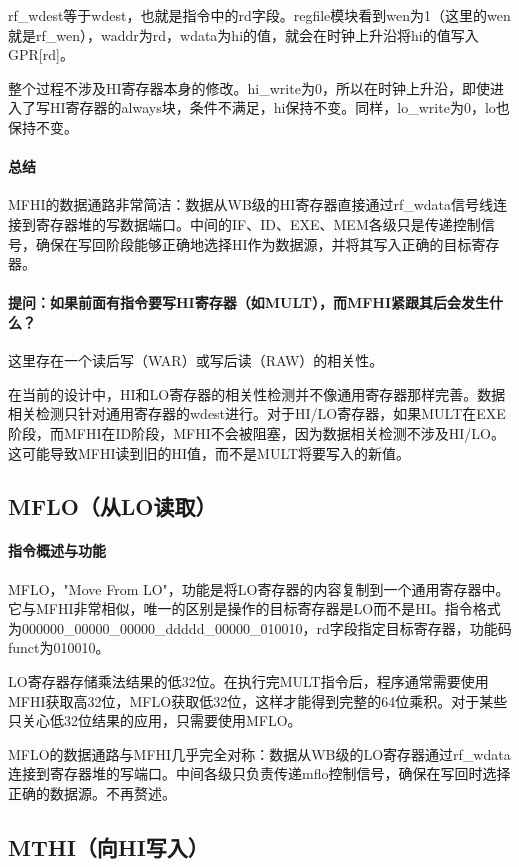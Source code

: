 \documentclass[a4paper]{article}
\begin{document}
	rf\_wdest等于wdest，也就是指令中的rd字段。regfile模块看到wen为1（这里的wen就是rf\_wen），waddr为rd，wdata为hi的值，就会在时钟上升沿将hi的值写入GPR[rd]。
	
	整个过程不涉及HI寄存器本身的修改。hi\_write为0，所以在时钟上升沿，即使进入了写HI寄存器的always块，条件不满足，hi保持不变。同样，lo\_write为0，lo也保持不变。
	\paragraph{总结}
	MFHI的数据通路非常简洁：数据从WB级的HI寄存器直接通过rf\_wdata信号线连接到寄存器堆的写数据端口。中间的IF、ID、EXE、MEM各级只是传递控制信号，确保在写回阶段能够正确地选择HI作为数据源，并将其写入正确的目标寄存器。
	\paragraph{提问：如果前面有指令要写HI寄存器（如MULT），而MFHI紧跟其后会发生什么？}
	这里存在一个读后写（WAR）或写后读（RAW）的相关性。
	
	在当前的设计中，HI和LO寄存器的相关性检测并不像通用寄存器那样完善。数据相关检测只针对通用寄存器的wdest进行。对于HI/LO寄存器，如果MULT在EXE阶段，而MFHI在ID阶段，MFHI不会被阻塞，因为数据相关检测不涉及HI/LO。这可能导致MFHI读到旧的HI值，而不是MULT将要写入的新值。
	
	\subsection{MFLO（从LO读取）}
	\paragraph{指令概述与功能}
	MFLO，"Move From LO"，功能是将LO寄存器的内容复制到一个通用寄存器中。它与MFHI非常相似，唯一的区别是操作的目标寄存器是LO而不是HI。指令格式为000000\_00000\_00000\_ddddd\_00000\_010010，rd字段指定目标寄存器，功能码funct为010010。
	
	LO寄存器存储乘法结果的低32位。在执行完MULT指令后，程序通常需要使用MFHI获取高32位，MFLO获取低32位，这样才能得到完整的64位乘积。对于某些只关心低32位结果的应用，只需要使用MFLO。
	
	MFLO的数据通路与MFHI几乎完全对称：数据从WB级的LO寄存器通过rf\_wdata连接到寄存器堆的写端口。中间各级只负责传递mflo控制信号，确保在写回时选择正确的数据源。不再赘述。
	
	\subsection{MTHI（向HI写入）}
\end{document}
